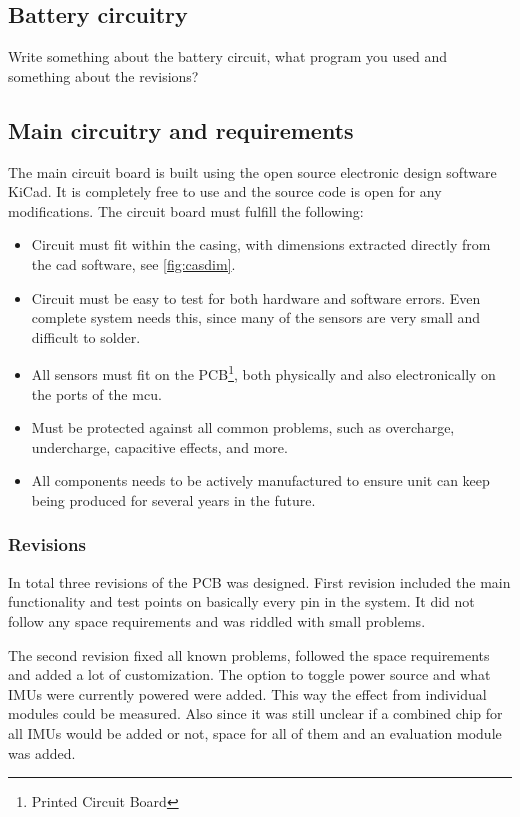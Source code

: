 \subsection{Battery circuitry}
Write something about the battery circuit, what program you used and something about the revisions?

\subsection{Main circuitry and requirements}
The main circuit board is built using the open source electronic design software KiCad\cite{kicad}. It is completely free to use and the source code is open for any modifications.
The circuit board must fulfill the following:
\begin{itemize}
\item Circuit must fit within the casing, with dimensions extracted directly from the cad software\cite{cad}, see \autoref{fig:casdim}.
\item Circuit must be easy to test for both hardware and software errors. Even complete system needs this, since many of the sensors are very small and difficult to solder.
\item All sensors must fit on the PCB\footnote{Printed Circuit Board}, both physically and also electronically on the ports of the \gls{mcu}.
\item Must be protected against all common problems, such as overcharge, undercharge, capacitive effects, and more.
\item All components needs to be actively manufactured to ensure unit can keep being produced for several years in the future.
\end{itemize}

\subsubsection{Revisions}
In total three revisions of the PCB was designed. First revision included the main functionality and test points on basically every pin in the system. It did not follow any space requirements and was riddled with small problems.

The second revision fixed all known problems, followed the space requirements and added a lot of customization. The option to toggle power source and what IMUs were currently powered were added. This way the effect from individual modules could be measured. Also since it was still unclear if a combined chip for all IMUs would be added or not, space for all of them and an evaluation module was added.

